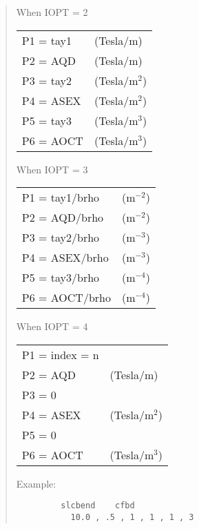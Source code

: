 \begin{quotation}
\begin{enumerate}
\begin{center}
                When IOPT = 2

\vspace{2mm}
\begin{tabular}{ll}
                     P1 = tay1 & (Tesla/m)\\
                     P2 = AQD  & (Tesla/m)\\
                     P3 = tay2 & (Tesla/$\mbox{m}^2$)\\
                     P4 = ASEX & (Tesla/$\mbox{m}^2$)\\
                     P5 = tay3 & (Tesla/$\mbox{m}^3$)\\
                     P6 = AOCT & (Tesla/$\mbox{m}^3$)\\
\end{tabular}
\vspace{5mm}

                When IOPT = 3

\vspace{2mm}
\begin{tabular}{ll}
                     P1 = tay1/brho & ($\mbox{m}^{-2}$)\\
                     P2 = AQD/brho  & ($\mbox{m}^{-2}$)\\
                     P3 = tay2/brho & ($\mbox{m}^{-3}$)\\
                     P4 = ASEX/brho & ($\mbox{m}^{-3}$)\\
                     P5 = tay3/brho & ($\mbox{m}^{-4}$)\\
                     P6 = AOCT/brho & ($\mbox{m}^{-4}$)
\end{tabular}
\vspace{5mm}

                When IOPT = 4

\vspace{2mm}
\begin{tabular}{ll}
                     P1 = index = n & \\
                     P2 = AQD  & (Tesla/m)\\
                     P3 = 0 & \\
                     P4 = ASEX & (Tesla/$\mbox{m}^2$)\\
                     P5 = 0 & \\
                     P6 = AOCT & (Tesla/$\mbox{m}^3$)\\
\end{tabular}
\end{center}
\end{enumerate}

\vspace{5mm}

\noindent Example:
\begin{verbatim}
         slcbend    cfbd
           10.0 , .5 , 1 , 1 , 1 , 3
\end{verbatim}
\end{quotation}
